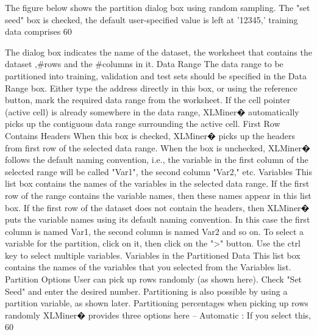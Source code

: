 The figure below shows the partition dialog box using random sampling. The "set seed" box is checked, the default user-specified value is left at '12345,' training data comprises 60%

The dialog box indicates the name of the dataset, the worksheet that contains the dataset ,#rows and the  #columns in it.
Data Range
The data range to be partitioned into training, validation and test sets should be specified in the Data Range box. Either type the address directly in this box, or using the reference button, mark the required data range from the worksheet. If the cell pointer (active cell) is already somewhere in the data range, XLMiner� automatically picks up the contiguous data range surrounding the active cell.
First Row Contains Headers
When this box is checked, XLMiner� picks up the headers from first row of the selected data range. When the box is unchecked, XLMiner� follows the default naming convention, i.e., the variable in the first column of the selected range will be called "Var1", the second column "Var2," etc.
Variables
This list box contains the names of the variables in the selected data range. If the first row of the range contains the variable names, then these names appear in this list box. If the first row of the dataset does not contain the headers, then XLMiner� puts the variable names using its default naming convention. In this case the first column is named Var1, the second column is named Var2 and so on.   To select a variable for the partition, click on it, then click on the ">" button.  Use the ctrl key to select multiple variables.
Variables in the Partitioned Data
This list box contains the names of the variables that you selected from the Variables list.
Partition Options
User can pick up rows randomly (as shown here). Check "Set Seed" and enter the desired number. Partitioning is also possible by using a partition variable, as shown later. 
Partitioning percentages when picking up rows randomly
XLMiner� provides three options here --
Automatic : If you select this, 60%
